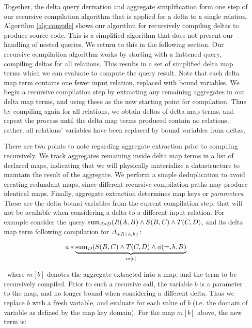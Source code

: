Together, the delta query derivation and aggregate simplification form one step
of our recursive compilation algorithm that is applied for a delta to a single
relation. 
Algorithm \ref{alg:compile} shows our algorithm for recursively compiling deltas
to produce source code. This is a simplified algorithm that does not present our
handling of nested queries. We return to this in the following section.  Our
recursive compilation algorithm works by starting with a flattened query,
compiling deltas for all relations. This results in a set of simplified delta
map terms which we can evaluate to compute the query result. Note that each
delta map term contains one fewer input relation, replaced with bound
variables. We begin a recursive compilation step by extracting any remaining
aggregates in our delta map terms, and using these as the new starting point for
compilation. Thus by compiling again for all relations, we obtain deltas of
delta map terms, and repeat the process until the delta map terms produced
contain no relations, rather, all relations' variables have been replaced by
bound variables from deltas.

There are two points to note regarding aggregate extraction prior to compiling
recursively. We track aggregates remaining inside delta map terms in a list of
declared maps, indicating that we will physically materialize a datastructure to
maintain the result of the aggregate. We perform a simple deduplication to avoid
creating redundant maps, since different recursive compilation paths may produce
identical maps. Finally, aggregate extraction determines map keys or
\textit{parameters}. These are the delta bound variables from the current
compilation step, that will not be available when considering a delta to a
different input relation. For example consider the query
$\mathrm{sum}_{A*D}(R(A,B) \wedge S(B,C) \wedge T(C,D)$, and its delta map term
following compilation for $\Delta_{+R(a,b)}$:

\[a*\underbrace{\mathrm{sum}_{D}(S(B,C) \wedge T(C,D) \wedge \phi(=,b,B)}_{m[b]}\]

\noindent~where $m[b]$ denotes the aggregate extracted into a map, and the term
to be recursively compiled. Prior to such a recursive call, the variable $b$ is
a parameter to the map, and no longer bound when considering a different
delta. Thus we replace $b$ with a fresh variable, and evaluate for each value of
$b$ (i.e. the domain of variable as defined by the map key domain). For the map
$m[b]$ above, the new term is:

